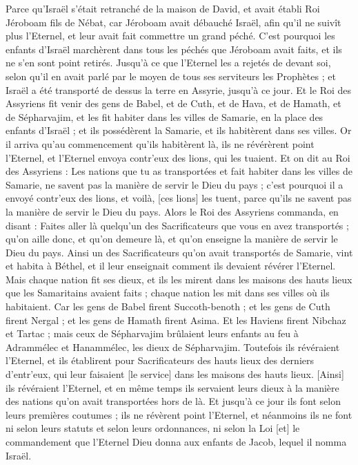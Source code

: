 \begin{multicols}{2}
Parce qu'Israël s'était retranché de la maison de David, et avait établi Roi Jéroboam fils de Nébat, car Jéroboam avait débauché Israël, afin qu'il ne suivît plus l'Eternel, et leur avait fait commettre un grand péché.
C'est pourquoi les enfants d'Israël marchèrent dans tous les péchés que Jéroboam avait faits, et ils ne s'en sont point retirés.
Jusqu'à ce que l'Eternel les a rejetés de devant soi, selon qu'il en avait parlé par le moyen de tous ses serviteurs les Prophètes ; et Israël a été transporté de dessus la terre en Assyrie, jusqu'à ce jour.
Et le Roi des Assyriens fit venir des gens de Babel, et de Cuth, et de Hava, et de Hamath, et de Sépharvajim, et les fit habiter dans les villes de Samarie, en la place des enfants d'Israël ; et ils possédèrent la Samarie, et ils habitèrent dans ses villes.
Or il arriva qu'au commencement qu'ils habitèrent là, ils ne révérèrent point l'Eternel, et l'Eternel envoya contr'eux des lions, qui les tuaient.
Et on dit au Roi des Assyriens : Les nations que tu as transportées et fait habiter dans les villes de Samarie, ne savent pas la manière de servir le Dieu du pays ; c'est pourquoi il a envoyé contr'eux des lions, et voilà, [ces lions] les tuent, parce qu'ils ne savent pas la manière de servir le Dieu du pays.
Alors le Roi des Assyriens commanda, en disant : Faites aller là quelqu'un des Sacrificateurs que vous en avez transportés ; qu'on aille donc, et qu'on demeure là, et qu'on enseigne la manière de servir le Dieu du pays.
Ainsi un des Sacrificateurs qu'on avait transportés de Samarie, vint et habita à Béthel, et il leur enseignait comment ils devaient révérer l'Eternel.
Mais chaque nation fit ses dieux, et ils les mirent dans les maisons des hauts lieux que les Samaritains avaient faits ; chaque nation les mit dans ses villes où ils habitaient.
Car les gens de Babel firent Succoth-benoth ; et les gens de Cuth firent Nergal ; et les gens de Hamath firent Asima.
Et les Haviens firent Nibchaz et Tartac ; mais ceux de Sépharvajim brûlaient leurs enfants au feu à Adrammélec et Hanammélec, les dieux de Sépharvajim.
Toutefois ils révéraient l'Eternel, et ils établirent pour Sacrificateurs des hauts lieux des derniers d'entr'eux, qui leur faisaient [le service] dans les maisons des hauts lieux.
[Ainsi] ils révéraient l'Eternel, et en même temps ils servaient leurs dieux à la manière des nations qu'on avait transportées hors de là.
Et jusqu'à ce jour ils font selon leurs premières coutumes ; ils ne révèrent point l'Eternel, et néanmoins ils ne font ni selon leurs statuts et selon leurs ordonnances, ni selon la Loi [et] le commandement que l'Eternel Dieu donna aux enfants de Jacob, lequel il nomma Israël.

\end{multicols}
